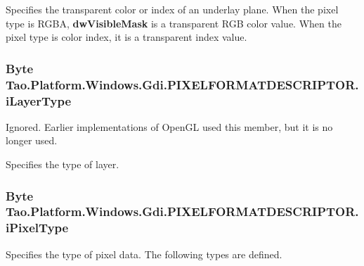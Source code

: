 Specifies the transparent color or index of an underlay plane. When the pixel type is RGBA, {\bfseries dwVisibleMask} is a transparent RGB color value. When the pixel type is color index, it is a transparent index value. 

\hypertarget{struct_tao_1_1_platform_1_1_windows_1_1_gdi_1_1_p_i_x_e_l_f_o_r_m_a_t_d_e_s_c_r_i_p_t_o_r_a014b1ee8659cc68d34c1f01d4ece7cb3}{
\subsubsection[{iLayerType}]{\setlength{\rightskip}{0pt plus 5cm}Byte {\bf Tao.Platform.Windows.Gdi.PIXELFORMATDESCRIPTOR.iLayerType}}}
\label{struct_tao_1_1_platform_1_1_windows_1_1_gdi_1_1_p_i_x_e_l_f_o_r_m_a_t_d_e_s_c_r_i_p_t_o_r_a014b1ee8659cc68d34c1f01d4ece7cb3}


Ignored. Earlier implementations of OpenGL used this member, but it is no longer used. 

Specifies the type of layer. \hypertarget{struct_tao_1_1_platform_1_1_windows_1_1_gdi_1_1_p_i_x_e_l_f_o_r_m_a_t_d_e_s_c_r_i_p_t_o_r_ae51ec99cf213a8bec317162fc313b34f}{
\subsubsection[{iPixelType}]{\setlength{\rightskip}{0pt plus 5cm}Byte {\bf Tao.Platform.Windows.Gdi.PIXELFORMATDESCRIPTOR.iPixelType}}}
\label{struct_tao_1_1_platform_1_1_windows_1_1_gdi_1_1_p_i_x_e_l_f_o_r_m_a_t_d_e_s_c_r_i_p_t_o_r_ae51ec99cf213a8bec317162fc313b34f}


Specifies the type of pixel data. The following types are defined. 

